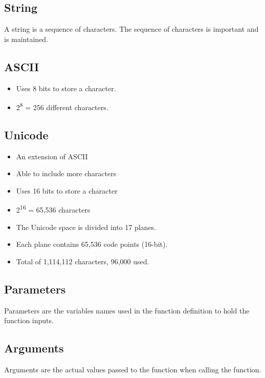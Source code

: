 \documentclass[11pt]{article}
\begin{document}
\subsection{String}
\label{sec:org8ab8291}
A string is a sequence of characters. The sequence of characters is important and is maintained.
\subsection{ASCII}
\label{sec:org2f40cac}
\begin{itemize}
\item Uses 8 bits to store a character.
\item 2\textsuperscript{8} = 256 different characters.
\end{itemize}
\subsection{Unicode}
\label{sec:orgbbb3e74}
\begin{itemize}
\item An extension of ASCII
\item Able to include more characters
\item Uses 16 bits to store a character
\item 2\textsuperscript{16} = 65,536 characters
\item The Unicode space is divided into 17 planes.
\item Each plane contains 65,536 code points (16-bit).
\item Total of 1,114,112 characters, 96,000 used.
\end{itemize}
\subsection{Parameters}
\label{sec:org0968b3b}
Parameters are the variables names used in the function definition to hold the function inputs.
\subsection{Arguments}
\label{sec:org5bfff6b}
Arguments are the actual values passed to the function when calling the function.
\end{document}
